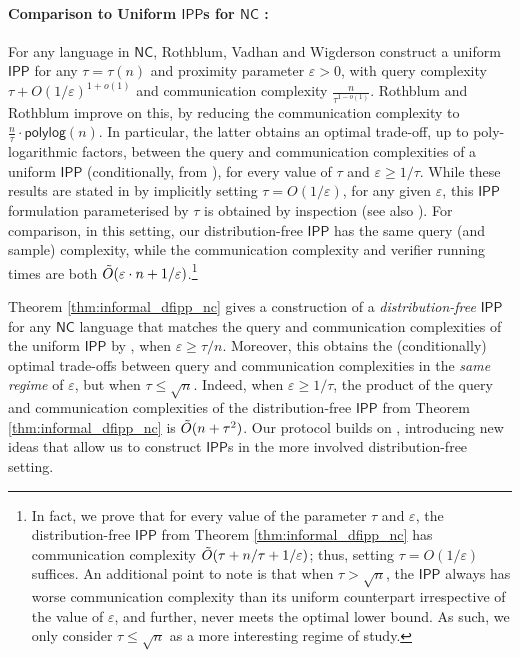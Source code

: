 \documentclass[10pt,a4paper]{article}
\newcommand{\polylog}{\mathsf{polylog}}
\newcommand{\NC}{\mathsf{NC}}
\newcommand{\IPP}{\mathsf{IPP}}
\newcommand{\eps}{\varepsilon}
\begin{document}
\paragraph*{Comparison to Uniform $\IPP$s for $\NC$ \cite{RVW,RR20_batch_polylog}:} For any language in $\NC$, Rothblum, Vadhan and Wigderson \cite{RVW} construct a uniform $\IPP$ for any $\tau=\tau(n)$ and proximity parameter $\eps > 0$, with query complexity $\tau + O(1/\eps)^{1+o(1)}$ and communication complexity $\frac{n}{\tau^{1-o(1)}}$. Rothblum and Rothblum \cite{RR20_batch_polylog} improve on this, by reducing the communication complexity to $\frac{n}{\tau} \cdot \polylog(n)$. In particular, the latter obtains an optimal trade-off, up to poly-logarithmic factors, between the query and communication complexities of a uniform $\IPP$ (conditionally, from \cite{KR15}), for every value of $\tau$ and $\eps \geq 1/\tau$. While these results are stated in \cite{RVW,RR20_batch_polylog} by implicitly setting $\tau = O(1/\eps)$, for any given $\eps$, this $\IPP$ formulation parameterised by $\tau$ is obtained by inspection (see also \cite[Theorem 6.3]{GG21_universal}). For comparison, in this setting, our distribution-free $\IPP$ has the same query (and sample) complexity, while the communication complexity and verifier running times are both $\Tilde{O}(\eps\cdot n + 1/\eps)$.\footnote{In fact, we prove that for every value of the parameter $\tau$ and $\eps$, the distribution-free $\IPP$ from Theorem \ref{thm:informal_dfipp_nc} has communication complexity $\Tilde{O}(\tau+n/\tau+1/\eps)$; thus, setting $\tau = O(1/\eps)$ suffices. An additional point to note is that when $\tau > \sqrt{n}$, the $\IPP$ always has worse communication complexity than its uniform counterpart irrespective of the value of $\eps$, and further, never meets the optimal \cite{KR15} lower bound. As such, we only consider $\tau \leq \sqrt{n}$ as a more interesting regime of study.}

Theorem \ref{thm:informal_dfipp_nc} gives a construction of a \emph{distribution-free} $\IPP$ for any $\NC$ language that matches the query and communication complexities of the uniform $\IPP$ by \cite{RR20_batch_polylog}, when $\eps \geq \tau/n$. Moreover, this obtains the (conditionally) optimal trade-offs between query and communication complexities in the \textit{same regime} of $\eps$, but when $\tau \leq \sqrt{n}$. Indeed, when $\eps \geq 1/\tau$, the product of the query and communication complexities of the distribution-free $\IPP$ from Theorem \ref{thm:informal_dfipp_nc} is $\Tilde{O}(n + \tau^2)$. Our protocol builds on \cite{RVW}, introducing new ideas that allow us to construct $\IPP$s in the more involved distribution-free setting. 
\end{document}
